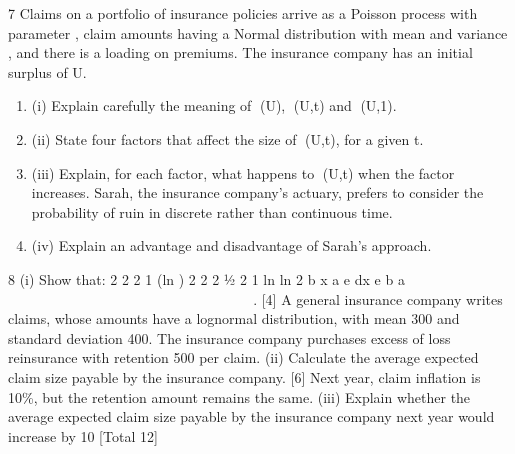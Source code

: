 \documentclass[a4paper,12pt]{article}
\begin{document}
 

7 Claims on a portfolio of insurance policies arrive as a Poisson process with parameter \lambda , claim amounts having a Normal distribution with mean \mu  and variance , and there is a loading \theta  on premiums. The insurance company has an initial
surplus of U.
\begin{enumerate}
\item (i) Explain carefully the meaning of (U), (U,t) and (U,1). \item 
(ii) State four factors that affect the size of (U,t), for a given t. 
\item 
(iii) Explain, for each factor, what happens to (U,t) when the factor increases. 
Sarah, the insurance company’s actuary, prefers to consider the probability of ruin in discrete rather than continuous time.
\item (iv) Explain an advantage and disadvantage of Sarah’s approach. 
\end{enumerate}
8 (i) Show that:
  2
2 2
1 (ln ) 2 2
2 ½
2
1 ln ln
2
b x
a
e dx e b a
 
  
           
                
 . [4]
A general insurance company writes claims, whose amounts have a lognormal
distribution, with mean 300 and standard deviation 400. The insurance company
purchases excess of loss reinsurance with retention 500 per claim.
(ii) Calculate the average expected claim size payable by the insurance
company. [6]
Next year, claim inflation is 10\%, but the retention amount remains the same.
(iii) Explain whether the average expected claim size payable by the insurance
company next year would increase by 10%
[Total 12]
\end{document}
